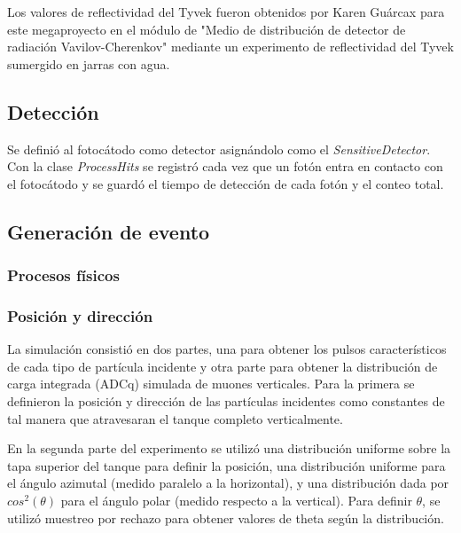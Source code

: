 \documentclass{book}
\begin{document}
Los valores de reflectividad del Tyvek fueron obtenidos por Karen Gu\'arcax para este megaproyecto en el m\'odulo de "Medio de distribuci\'on de detector de radiaci\'on Vavilov-Cherenkov" mediante un experimento de reflectividad del Tyvek sumergido en jarras con agua.

\subsection{Detecci\'on}
Se defini\'o al fotoc\'atodo como detector asign\'andolo como el \textit{SensitiveDetector}. Con la clase \textit{ProcessHits} se registr\'o cada vez que un fot\'on entra en contacto con el fotoc\'atodo y se guard\'o el tiempo de detecci\'on de cada fot\'on y el conteo total.

\subsection{Generaci\'on de evento}

\subsubsection{Procesos f\'isicos}
\subsubsection{Posici\'on y direcci\'on}
La simulaci\'on consisti\'o en dos partes, una para obtener los pulsos caracter\'isticos de cada tipo de part\'icula incidente y otra parte para obtener la distribuci\'on de carga integrada (ADCq) simulada de muones verticales. Para la primera se definieron la posici\'on y direcci\'on de las part\'iculas incidentes como constantes de tal manera que atravesaran el tanque completo verticalmente.

En la segunda parte del experimento se utiliz\'o una distribuci\'on uniforme sobre la tapa superior del tanque para definir la posici\'on, una distribuci\'on uniforme para el \'angulo azimutal (medido paralelo a la horizontal), y una distribuci\'on dada por $cos^2(\theta)$ para el \'angulo polar (medido respecto a la vertical). Para definir $\theta$, se utiliz\'o muestreo por rechazo para obtener valores de theta seg\'un la distribuci\'on.
\end{document}
